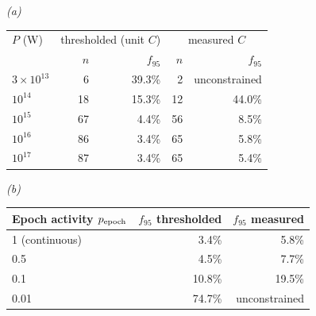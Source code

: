 \emph{(a)}\\[2pt]
\begin{tabular}{@{}lrrrr@{}}
\toprule
$P$ (W) & \multicolumn{2}{c}{thresholded (unit $C$)} &
\multicolumn{2}{c}{measured $C$} \\
 & $n$ & $f_{95}$ & $n$ & $f_{95}$ \\
\midrule
$3\times10^{13}$ & 6 & 39.3\% & 2 & unconstrained \\
$10^{14}$ & 18 & 15.3\% & 12 & 44.0\% \\
$10^{15}$ & 67 & 4.4\% & 56 & 8.5\% \\
$10^{16}$ & 86 & 3.4\% & 65 & 5.8\% \\
$10^{17}$ & 87 & 3.4\% & 65 & 5.4\% \\
\bottomrule
\end{tabular}

\smallskip
\emph{(b)}\\[2pt]
\begin{tabular}{@{}lrr@{}}
\toprule
Epoch activity $p_{\rm epoch}$ & $f_{95}$ thresholded & $f_{95}$ measured \\
\midrule
1 (continuous) & 3.4\% & 5.8\% \\
0.5 & 4.5\% & 7.7\% \\
0.1 & 10.8\% & 19.5\% \\
0.01 & 74.7\% & unconstrained \\
\bottomrule
\end{tabular}

